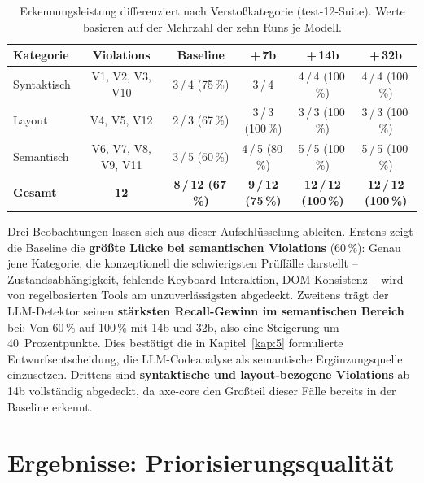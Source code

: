 \begin{table}[htbp]
\centering
\small
\renewcommand{\arraystretch}{1.15}
\begin{tabular}{@{}lccccc@{}}
\toprule
\textbf{Kategorie} & \textbf{Violations} & \textbf{Baseline} & \textbf{+\,7b} & \textbf{+\,14b} & \textbf{+\,32b} \\
\midrule
Syntaktisch & V1, V2, V3, V10 & 3\,/\,4 (75\,\%) & 3\,/\,4 & 4\,/\,4 (100\,\%) & 4\,/\,4 (100\,\%) \\
Layout      & V4, V5, V12     & 2\,/\,3 (67\,\%) & 3\,/\,3 (100\,\%) & 3\,/\,3 (100\,\%) & 3\,/\,3 (100\,\%) \\
Semantisch  & V6, V7, V8, V9, V11 & 3\,/\,5 (60\,\%) & 4\,/\,5 (80\,\%) & 5\,/\,5 (100\,\%) & 5\,/\,5 (100\,\%) \\
\midrule
\textbf{Gesamt} & \textbf{12} & \textbf{8\,/\,12 (67\,\%)} & \textbf{9\,/\,12 (75\,\%)} & \textbf{12\,/\,12 (100\,\%)} & \textbf{12\,/\,12 (100\,\%)} \\
\bottomrule
\end{tabular}
\caption[Recall nach Verstoßkategorie und Modell]{Erkennungsleistung differenziert nach Verstoßkategorie (test-12-Suite). Werte basieren auf der Mehrzahl der zehn Runs je Modell.}
\label{tab:recall_kategorie}
\end{table}

Drei Beobachtungen lassen sich aus dieser Aufschlüsselung ableiten. Erstens zeigt die Baseline die \textbf{größte Lücke bei semantischen Violations} (60\,\%): Genau jene Kategorie, die konzeptionell die schwierigsten Prüffälle darstellt -- Zustandsabhängigkeit, fehlende Keyboard-Interaktion, \ac{DOM}-Konsistenz -- wird von regelbasierten Tools am unzuverlässigsten abgedeckt. Zweitens trägt der \ac{LLM}-Detektor seinen \textbf{stärksten Recall-Gewinn im semantischen Bereich} bei: Von 60\,\% auf 100\,\% mit 14b und 32b, also eine Steigerung um 40~Prozentpunkte. Dies bestätigt die in Kapitel~\ref{kap:5} formulierte Entwurfsentscheidung, die \ac{LLM}-Codeanalyse als semantische Ergänzungsquelle einzusetzen. Drittens sind \textbf{syntaktische und layout-bezogene Violations} ab 14b vollständig abgedeckt, da axe-core den Großteil dieser Fälle bereits in der Baseline erkennt.

\section{Ergebnisse: Priorisierungsqualität}
\label{sec:ergebnisse_priorisierung}


